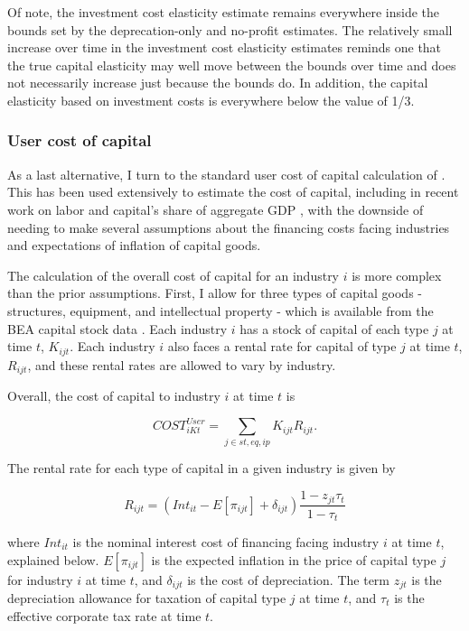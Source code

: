 \documentclass[11pt]{article}
\begin{document}
Of note, the investment cost elasticity estimate remains everywhere inside the bounds set by the deprecation-only and no-profit estimates. The relatively small increase over time in the investment cost elasticity estimates reminds one that the true capital elasticity may well move between the bounds over time and does not necessarily increase just because the bounds do. In addition, the capital elasticity based on investment costs is everywhere below the value of 1/3.

\subsubsection{User cost of capital}
As a last alternative, I turn to the standard user cost of capital calculation of \cite{halljorg1967}. This has been used extensively to estimate the cost of capital, including in recent work on labor and capital's share of aggregate GDP \citep{Barkai000}, with the downside of needing to make several assumptions about the financing costs facing industries and expectations of inflation of capital goods. 

The calculation of the overall cost of capital for an industry $i$ is more complex than the prior assumptions. First, I allow for three types of capital goods - structures, equipment, and intellectual property - which is available from the BEA capital stock data \citep{beacap,beagov}. Each industry $i$ has a stock of capital of each type $j$ at time $t$, $K_{ijt}$. Each industry $i$ also faces a rental rate for capital of type $j$ at time $t$, $R_{ijt}$, and these rental rates are allowed to vary by industry.

Overall, the cost of capital to industry $i$ at time $t$ is

\begin{equation}
	COST^{User}_{iKt} = \sum_{j \in st,eq,ip} K_{ijt} R_{ijt}.
\end{equation}

The rental rate for each type of capital in a given industry is given by

\begin{equation}
	R_{ijt} = (Int_{it} - E[\pi_{ijt}] + \delta_{ijt})\frac{1-z_{jt} \tau_t}{1-\tau_t}
\end{equation}

where $Int_{it}$ is the nominal interest cost of financing facing industry $i$ at time $t$, explained below. $E[\pi_{ijt}]$ is the expected inflation in the price of capital type $j$ for industry $i$ at time $t$, and $\delta_{ijt}$ is the cost of depreciation. The term $z_{jt}$ is the depreciation allowance for taxation of capital type $j$ at time $t$, and $\tau_t$ is the effective corporate tax rate at time $t$.
\end{document}

